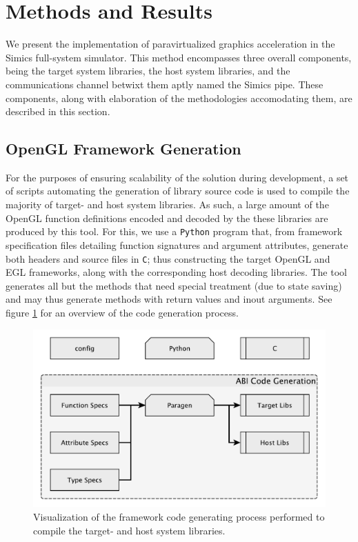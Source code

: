 
\section{Methods and Results}
\label{sec:methodsandresults}
We present the implementation of paravirtualized graphics acceleration in the Simics full-system simulator.
This method encompasses three overall components, being the target system libraries, the host system libraries, and the communications channel betwixt them aptly named the Simics pipe.
These components, along with elaboration of the methodologies accomodating them, are described in this section.

\subsection{OpenGL Framework Generation}
\label{sec:proposedsolutionandimplementation_openglabigeneration}
For the purposes of ensuring scalability of the solution during development, a set of scripts automating the generation of library source code is used to compile the majority of target- and host system libraries.
As such, a large amount of the OpenGL function definitions encoded and decoded by the these libraries are produced by this tool.
For this, we use a \texttt{Python} program that, from framework specification files detailing function signatures and argument attributes, generate both headers and source files in \texttt{C}; thus constructing the target OpenGL and EGL frameworks, along with the corresponding host decoding libraries.
The tool generates all but the methods that need special treatment (due to state saving) and may thus generate methods with return values and inout arguments.
See figure \ref{fig:abigeneration} for an overview of the code generation process.

\begin{figure}
  \centering
  \includegraphics[width=\linewidth]{img/yedabigeneration.pdf}
  \caption[The framework generation process]{Visualization of the framework code generating process performed to compile the target- and host system libraries.}
  \label{fig:abigeneration}
\end{figure}

